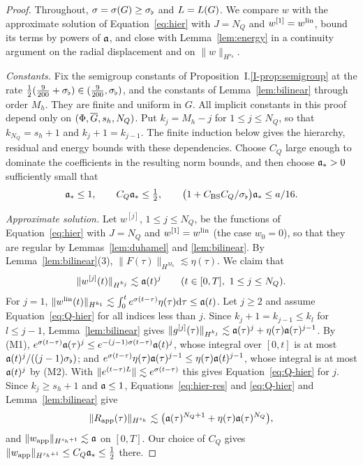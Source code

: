\begin{proof}
Throughout, $\sigma=\sigma(G)\ge\sigma_\flat$ and $L=L(G)$. We compare $w$ with the
approximate solution of Equation~\eqref{eq:hier} with $J=N_Q$ and $w^{[1]}=w^{\mathrm{lin}}$,
bound its terms by powers of $\mathfrak{a}$, and close with Lemma~\ref{lem:energy} in a
continuity argument on the radial displacement and on $\|w\|_{H^{s_h}}$.

\emph{Constants.} Fix the semigroup constants of
Proposition~I.\ref{I-prop:semigroup} at the rate
$\frac12(\frac9{200}+\sigma_\flat)\in(\frac9{200},\sigma_\flat)$, and the constants of
Lemma~\ref{lem:bilinear} through order $M_h$. They are finite and uniform
in $G$. All implicit constants in this proof depend only on
$(\Phi,\overline{G},s_h,N_Q)$. Put $k_j=M_h-j$ for $1\le j\le N_Q$, so that
$k_{N_Q}=s_h+1$ and $k_j+1=k_{j-1}$. The finite induction below gives the
hierarchy, residual and energy bounds with these dependencies. Choose $C_Q$
large enough to dominate the coefficients in the resulting norm bounds,
and then choose $\mathfrak{a}_*>0$ sufficiently small that
\[
\mathfrak{a}_*\le1,\qquad C_Q\mathfrak{a}_*\le\tfrac12,\qquad
\big(1+C_{\mathrm{BS}}C_Q/\sigma_\flat\big)\mathfrak{a}_*\le a/16.
\]

\emph{Approximate solution.} Let $w^{[j]}$, $1\le j\le N_Q$, be the functions of
Equation~\eqref{eq:hier} with $J=N_Q$ and $w^{[1]}=w^{\mathrm{lin}}$ (the case $w_0=0$), so that
they are regular by Lemmas~\ref{lem:duhamel} and \ref{lem:bilinear}. By
Lemma~\ref{lem:bilinear}\textup{(3)},
$\|F(\tau)\|_{H^{M_h}}\lesssim\eta(\tau)$. We claim that
\begin{equation}
\label{eq:Q-hier}
\|w^{[j]}(t)\|_{H^{k_j}}\lesssim\mathfrak{a}(t)^j\qquad(t\in[0,T],\ 1\le j\le N_Q).
\end{equation}
For $j=1$,
$\|w^{\mathrm{lin}}(t)\|_{H^{k_1}}\lesssim\int_0^te^{\sigma(t-\tau)}\eta(\tau)\dd\tau\le\mathfrak{a}(t)$.
Let $j\ge2$ and assume Equation~\eqref{eq:Q-hier} for all indices less than $j$.
Since $k_j+1=k_{j-1}\le k_l$ for $l\le j-1$, Lemma~\ref{lem:bilinear} gives
$\|g^{[j]}(\tau)\|_{H^{k_j}}\lesssim\mathfrak{a}(\tau)^j+\eta(\tau)\mathfrak{a}(\tau)^{j-1}$.
By (M1), $e^{\sigma(t-\tau)}\mathfrak{a}(\tau)^j\le e^{-(j-1)\sigma(t-\tau)}\mathfrak{a}(t)^j$, whose
integral over $[0,t]$ is at most $\mathfrak{a}(t)^j/((j-1)\sigma_\flat)$; and
$e^{\sigma(t-\tau)}\eta(\tau)\mathfrak{a}(\tau)^{j-1}\le\eta(\tau)\mathfrak{a}(t)^{j-1}$, whose integral
is at most $\mathfrak{a}(t)^j$ by (M2). With $\|e^{(t-\tau)L}\|\lesssim e^{\sigma(t-\tau)}$ this
gives Equation~\eqref{eq:Q-hier} for $j$. Since $k_j\ge s_h+1$ and $\mathfrak{a}\le1$,
Equations~\eqref{eq:hier-res} and \eqref{eq:Q-hier} and Lemma~\ref{lem:bilinear} give
\begin{equation}
\label{eq:Q-res}
\|R_{\mathrm{app}}(\tau)\|_{H^{s_h}}\lesssim\big(\mathfrak{a}(\tau)^{N_Q+1}+\eta(\tau)\mathfrak{a}(\tau)^{N_Q}\big),
\end{equation}
and $\|w_{\mathrm{app}}\|_{H^{s_h+1}}\lesssim\mathfrak{a}$ on $[0,T]$. Our choice of
$C_Q$ gives $\|w_{\mathrm{app}}\|_{H^{s_h+1}}\le C_Q\mathfrak{a}_*\le\frac12$ there.


\end{proof}
